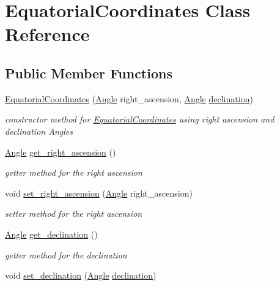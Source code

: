 \hypertarget{classEquatorialCoordinates}{}\section{Equatorial\+Coordinates Class Reference}
\label{classEquatorialCoordinates}
\subsection*{Public Member Functions}
\begin{DoxyCompactItemize}
\item 
\mbox{\hyperlink{classEquatorialCoordinates_a4a147efb5882e12d1f8bc5cacd0e51a7}{Equatorial\+Coordinates}} (\mbox{\hyperlink{classAngle}{Angle}} right\+\_\+ascension, \mbox{\hyperlink{classAngle}{Angle}} \mbox{\hyperlink{structdeclination}{declination}})
\begin{DoxyCompactList}\small\item\em constructor method for \mbox{\hyperlink{classEquatorialCoordinates}{Equatorial\+Coordinates}} using right ascension and declination Angles \end{DoxyCompactList}\item 
\mbox{\hyperlink{classAngle}{Angle}} \mbox{\hyperlink{classEquatorialCoordinates_a48517346b93fc6b7082ebaed0851a6e8}{get\+\_\+right\+\_\+ascension}} ()
\begin{DoxyCompactList}\small\item\em getter method for the right ascension \end{DoxyCompactList}\item 
void \mbox{\hyperlink{classEquatorialCoordinates_ad6eac3da25d92a4e6c52f920d825ed43}{set\+\_\+right\+\_\+ascension}} (\mbox{\hyperlink{classAngle}{Angle}} right\+\_\+ascension)
\begin{DoxyCompactList}\small\item\em setter method for the right ascension \end{DoxyCompactList}\item 
\mbox{\hyperlink{classAngle}{Angle}} \mbox{\hyperlink{classEquatorialCoordinates_abdfc3d2ece63332b9a6a2267ae886710}{get\+\_\+declination}} ()
\begin{DoxyCompactList}\small\item\em getter method for the declination \end{DoxyCompactList}\item 
void \mbox{\hyperlink{classEquatorialCoordinates_ad3136302cdf4904010f22407071aa722}{set\+\_\+declination}} (\mbox{\hyperlink{classAngle}{Angle}} \mbox{\hyperlink{structdeclination}{declination}})

\end{DoxyCompactItemize}
